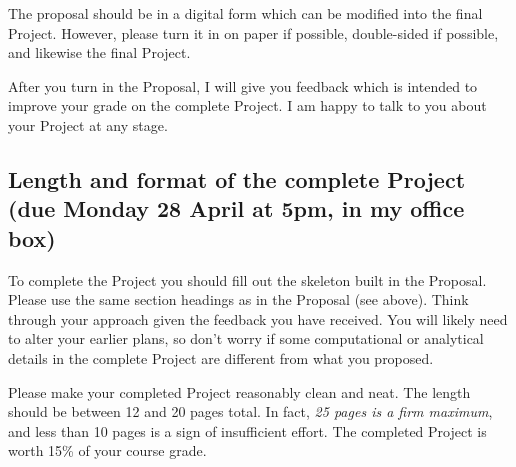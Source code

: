 \documentclass[11pt]{amsart}
\begin{document}
The proposal should be in a digital form which can be modified into the final Project.  However, please turn it in on paper if possible, double-sided if possible, and likewise the final Project.

After you turn in the Proposal, I will give you feedback which is intended to improve your grade on the complete Project.  I am happy to talk to you about your Project at any stage.


\subsection*{Length and format of the complete Project (due Monday 28 April at 5pm, in my office box)}  To complete the Project you should fill out the skeleton built in the Proposal.  Please use the same section headings as in the Proposal (see above).  Think through your approach given the feedback you have received.  You will likely need to alter your earlier plans, so don't worry if some computational or analytical details in the complete Project are different from what you proposed.

Please make your completed Project reasonably clean and neat.  The length should be between 12 and 20 pages total.  In fact, \emph{25 pages is a firm maximum}, and less than 10 pages is a sign of insufficient effort.  The completed Project is worth 15\% of your course grade.
\end{document}
